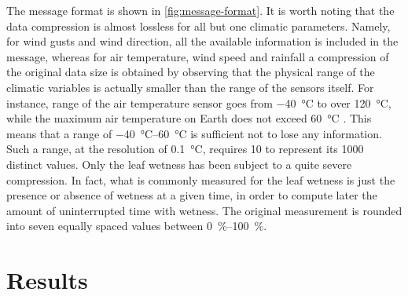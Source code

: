 \documentclass[conference]{IEEEtran}
\begin{document}
The message format is shown in \cref{fig:message-format}. 
It is worth noting that the data compression is almost lossless for all but one climatic parameters. 
Namely, for wind gusts and wind direction, all the available information  is included in the message, whereas for air temperature, wind speed and rainfall a compression of the original data size is obtained by observing that the physical range of the climatic variables is actually smaller than the range of the sensors itself. 
For instance, range of the air temperature sensor goes from \SI{-40}{\celsius} to over \SI{120}{\celsius}, while the maximum air temperature on Earth does not exceed \SI{60}{\celsius} \cite{court:max-temp,roof:max-temp}. 
This means that a range of \SIrange{-40}{60}{\celsius} is sufficient not to lose any information. 
Such a range, at the resolution of \SI{0.1}{\celsius}, requires \SI{10}{\bit} to represent its 1000 distinct values. 
Only the leaf wetness has been subject to a quite severe compression. %
In fact, what is commonly measured  for the leaf wetness  is just the presence or absence of wetness at a given time, in order to compute later the amount of uninterrupted time with wetness.
The original measurement is rounded into seven equally spaced values between \SIrange{0}{100}{\%}.




\section{Results}
\end{document}
